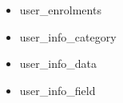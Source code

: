 \documentclass[a4paper, 14pt]{extarticle}
\begin{document}
\begin{itemize}
\begin{itemize}
            \item user\_enrolments
            \item user\_info\_category
            \item user\_info\_data
            \item user\_info\_field

\end{itemize}
\end{itemize}
\end{document}
